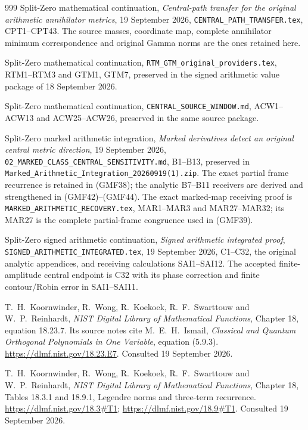 \begin{thebibliography}{999}
Split-Zero mathematical continuation,
\emph{Central-path transfer for the original arithmetic
annihilator metrics}, 19 September 2026,
\texttt{CENTRAL\_PATH\_TRANSFER.tex}, CPT1--CPT43.
The source masses, coordinate map, complete annihilator
minimum correspondence and original Gamma norms are the
ones retained here.

Split-Zero mathematical continuation,
\texttt{RTM\_GTM\_original\_providers.tex},
RTM1--RTM3 and GTM1, GTM7, preserved in the signed arithmetic
value package of 18 September 2026.

Split-Zero mathematical continuation,
\texttt{CENTRAL\_SOURCE\_WINDOW.md}, ACW1--ACW13 and
ACW25--ACW26, preserved in the same source package.

Split-Zero marked arithmetic integration,
\emph{Marked derivatives detect an original central metric
direction}, 19 September 2026,
\texttt{02\_MARKED\_CLASS\_CENTRAL\_SENSITIVITY.md},
B1--B13, preserved in
\texttt{Marked\_Arithmetic\_Integration\_20260919(1).zip}.
The exact partial frame recurrence is retained in (GMF38);
the analytic B7--B11 receivers are derived and strengthened
in (GMF42)--(GMF44).
The exact marked-map receiving proof is
\texttt{MARKED\_ARITHMETIC\_RECOVERY.tex},
MAR1--MAR3 and MAR27--MAR32; its MAR27 is the complete
partial-frame congruence used in (GMF39).

Split-Zero signed arithmetic continuation,
\emph{Signed arithmetic integrated proof},
\texttt{SIGNED\_ARITHMETIC\_INTEGRATED.tex},
19 September 2026, C1--C32, the original analytic
appendices, and receiving calculations SAI1--SAI12.
The accepted finite-amplitude central endpoint is C32
with its phase correction and finite contour/Robin
error in SAI1--SAI11.

T.\ H.\ Koornwinder, R.\ Wong, R.\ Koekoek,
R.\ F.\ Swarttouw and W.\ P.\ Reinhardt,
\emph{NIST Digital Library of Mathematical Functions},
Chapter 18, equation 18.23.7.
Its source notes cite M.\ E.\ H.\ Ismail,
\emph{Classical and Quantum Orthogonal Polynomials in One
Variable}, equation (5.9.3).
\url{https://dlmf.nist.gov/18.23.E7}.
Consulted 19 September 2026.

T.\ H.\ Koornwinder, R.\ Wong, R.\ Koekoek,
R.\ F.\ Swarttouw and W.\ P.\ Reinhardt,
\emph{NIST Digital Library of Mathematical Functions},
Chapter 18, Tables 18.3.1 and 18.9.1,
Legendre norms and three-term recurrence.
\url{https://dlmf.nist.gov/18.3#T1};
\url{https://dlmf.nist.gov/18.9#T1}.
Consulted 19 September 2026.


\end{thebibliography}

